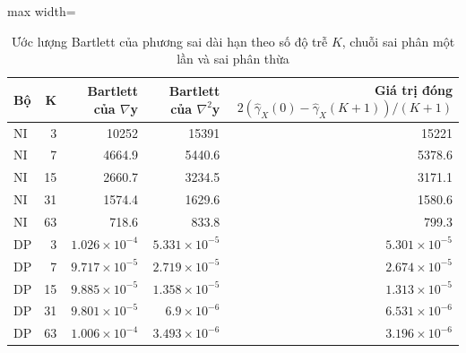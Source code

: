 \begin{table}[H]
\centering\footnotesize
\caption{Ước lượng Bartlett của phương sai dài hạn theo số độ trễ $K$, chuỗi sai phân một lần và sai phân thừa}\label{tab:tab_b12_03_bartlett_by_k}
\begin{adjustbox}{max width=\linewidth}
\begin{tabular}{|l|r|r|r|r|}
\toprule
Bộ & K & Bartlett của $\nabla$y & Bartlett của $\nabla^{2}$y & Giá trị đóng $2(\hat\gamma_X(0)-\hat\gamma_X(K+1))/(K+1)$ \\
\midrule
NI & 3 & 10252 & 15391 & 15221 \\
NI & 7 & 4664.9 & 5440.6 & 5378.6 \\
NI & 15 & 2660.7 & 3234.5 & 3171.1 \\
NI & 31 & 1574.4 & 1629.6 & 1580.6 \\
NI & 63 & 718.6 & 833.8 & 799.3 \\
DP & 3 & $1.026\times10^{-4}$ & $5.331\times10^{-5}$ & $5.301\times10^{-5}$ \\
DP & 7 & $9.717\times10^{-5}$ & $2.719\times10^{-5}$ & $2.674\times10^{-5}$ \\
DP & 15 & $9.885\times10^{-5}$ & $1.358\times10^{-5}$ & $1.313\times10^{-5}$ \\
DP & 31 & $9.801\times10^{-5}$ & $6.9\times10^{-6}$ & $6.531\times10^{-6}$ \\
DP & 63 & $1.006\times10^{-4}$ & $3.493\times10^{-6}$ & $3.196\times10^{-6}$ \\
\bottomrule
\end{tabular}
\end{adjustbox}\par{}
\end{table}
